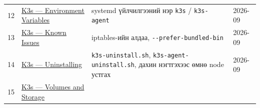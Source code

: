 \begin{longtable}[]{@{}llll@{}}
\begin{minipage}[t]{0.22\columnwidth}
12\strut
\end{minipage} & \begin{minipage}[t]{0.22\columnwidth}\raggedright
\href{https://docs.k3s.io/reference/env-variables}{K3s --- Environment Variables}\strut
\end{minipage} & \begin{minipage}[t]{0.22\columnwidth}\raggedright
systemd үйлчилгээний нэр \texttt{k3s} / \texttt{k3s-agent}\strut
\end{minipage} & \begin{minipage}[t]{0.22\columnwidth}\raggedright
2026-09\strut
\end{minipage}\tabularnewline
\begin{minipage}[t]{0.22\columnwidth}\raggedright
13\strut
\end{minipage} & \begin{minipage}[t]{0.22\columnwidth}\raggedright
\href{https://docs.k3s.io/known-issues}{K3s --- Known Issues}\strut
\end{minipage} & \begin{minipage}[t]{0.22\columnwidth}\raggedright
iptables-ийн алдаа, \texttt{-\/\allowbreak{}-prefer-bundled-bin}\strut
\end{minipage} & \begin{minipage}[t]{0.22\columnwidth}\raggedright
2026-09\strut
\end{minipage}\tabularnewline
\begin{minipage}[t]{0.22\columnwidth}\raggedright
14\strut
\end{minipage} & \begin{minipage}[t]{0.22\columnwidth}\raggedright
\href{https://docs.k3s.io/installation/uninstall}{K3s --- Uninstalling}\strut
\end{minipage} & \begin{minipage}[t]{0.22\columnwidth}\raggedright
\texttt{k3s-uninstall.sh}, \texttt{k3s-agent-uninstall.\allowbreak{}sh}, дахин нэгтгэхээс өмнө node устгах\strut
\end{minipage} & \begin{minipage}[t]{0.22\columnwidth}\raggedright
2026-09\strut
\end{minipage}\tabularnewline
\begin{minipage}[t]{0.22\columnwidth}\raggedright
15\strut
\end{minipage} & \begin{minipage}[t]{0.22\columnwidth}\raggedright
\href{https://docs.k3s.io/add-ons/storage}{K3s --- Volumes and Storage}\strut
\end{minipage} & \begin{minipage}[t]{0.22\columnwidth}\raggedright

\end{minipage}
\end{longtable}
